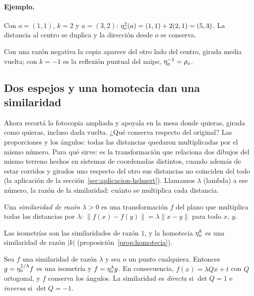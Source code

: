 \paragraph{Ejemplo.}
Con \(o=(1,1)\), \(k=2\) y \(a=(3,2)\): \(\eta_{o}^{2}(a)=(1,1)+2(2,1)=(5,3)\). La distancia al
centro se duplica y la dirección desde \(o\) se conserva.

Con una razón negativa la copia aparece del otro lado del centro, girada media vuelta; con
\(k=-1\) es la reflexión puntual del naipe, \(\eta_{o}^{-1}=\rho_{o}\).

\subsection{Dos espejos y una homotecia dan una similaridad}\label{sec:similaridad}

Ahora recortá la fotocopia ampliada y apoyala en la mesa donde quieras, girada como quieras,
incluso dada vuelta. ¿Qué conserva respecto del original? Las proporciones y los ángulos: todas
las distancias quedaron multiplicadas por el mismo número. Para qué sirve: es la transformación
que relaciona dos dibujos del mismo terreno hechos en sistemas de coordenadas distintos, cuando
además de estar corridos y girados uno respecto del otro sus distancias no coinciden del todo
(la aplicación de la sección~\ref{sec:aplicacion-helmert}). Llamamos \(\lambda\) (lambda) a ese
número, la razón de la similaridad: cuánto se multiplica cada distancia.

\begin{definicion}[Similaridad]\label{def:similaridad}
Una \emph{similaridad de razón \(\lambda>0\)} es una transformación \(f\) del plano que
multiplica todas las distancias por \(\lambda\):
\(\lVert f(x)-f(y)\rVert=\lambda\lVert x-y\rVert\) para todo \(x\), \(y\).
\end{definicion}

Las isometrías son las similaridades de razón \(1\), y la homotecia \(\eta_{o}^{k}\) es una
similaridad de razón \(|k|\) (proposición~\ref{prop:homotecia}).

\begin{proposicion}\label{prop:similaridad-afin}
Sea \(f\) una similaridad de razón \(\lambda\) y sea \(o\) un punto cualquiera. Entonces
\(g=\eta_{o}^{1/\lambda}f\) es una isometría y \(f=\eta_{o}^{\lambda}g\). En consecuencia,
\(f(x)=\lambda Qx+t\) con \(Q\) ortogonal, y \(f\) conserva los ángulos. La similaridad es
\emph{directa} si \(\det Q=1\) e \emph{inversa} si \(\det Q=-1\).
\end{proposicion}


